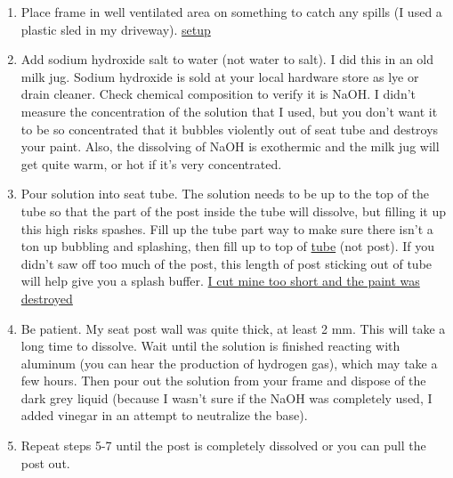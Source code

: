 \documentclass{article}
\begin{document}
\begin{itemize}
\begin{enumerate}
\item Place frame in well ventilated area on something to catch any
spills (I used a plastic sled in my driveway). \href{blog\_imgs/free\_seatpost/setup.jpg}{setup}
\item Add sodium hydroxide salt to water (not water to salt).  I did this
in an old milk jug.  Sodium hydroxide is sold at your local
hardware store as lye or drain cleaner.  Check chemical composition
to verify it is NaOH.  I didn't measure the concentration of the
solution that I used, but you don't want it to be so concentrated
that it bubbles violently out of seat tube and destroys your paint.  Also,
the dissolving of NaOH is exothermic and the milk jug will get
quite warm, or hot if it's very concentrated.
\item Pour solution into seat tube.  The solution needs to be up to the
top of the tube so that the part of the post inside the tube will
dissolve, but filling it up this high risks spashes.  Fill up the
tube part way to make sure there isn't a ton up bubbling and
splashing, then fill up to top of \uline{tube} (not post).  If you didn't saw off too
much of the post, this length of post sticking out of tube will
help give you a splash buffer.
\href{blog\_imgs/free\_seatpost/bubbling.jpg}{I cut mine too short and the paint was destroyed}
\item Be patient.  My seat post wall was quite thick, at least 2 mm.
This will take a long time to dissolve.  Wait until the solution is
finished reacting with aluminum (you can hear the production of
hydrogen gas), which may take a few hours.  Then pour out the
solution from your frame and dispose of the dark grey liquid
(because I wasn't sure if the NaOH was completely used, I added
vinegar in an attempt to neutralize the base).
\item Repeat steps 5-7 until the post is completely dissolved or you
can pull the post out.
\end{enumerate}


\end{itemize}
\end{document}
